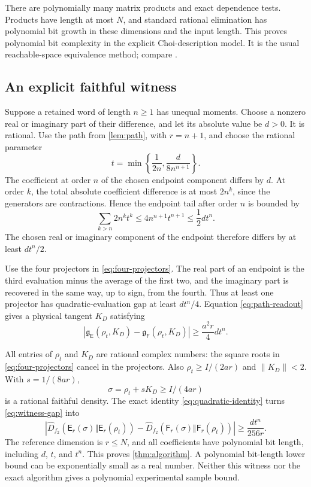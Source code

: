 \documentclass[11pt,reqno]{amsart}
\theoremstyle{definition}
\theoremstyle{remark}
\numberwithin{equation}{section}
\newcommand{\E}{\mathsf E}
\newcommand{\F}{\mathsf F}
\newcommand{\norm}[1]{\left\lVert#1\right\rVert}
\newcommand{\abs}[1]{\left\lvert#1\right\rvert}
\newcommand{\rld}{\mathfrak g}
\newcommand{\maxdiv}{\widehat D}
\begin{document}
There are polynomially many matrix products and exact dependence tests. Products have length at most $N$, and standard rational elimination has polynomial bit growth in these dimensions and the input length. This proves polynomial bit complexity in the explicit Choi-description model. It is the usual reachable-space equivalence method; compare \cite[Theorem~2]{LiQiu}.

\subsection{An explicit faithful witness}

Suppose a retained word of length $n\ge1$ has unequal moments. Choose a nonzero real or imaginary part of their difference, and let its absolute value be $d>0$. It is rational. Use the path from \cref{lem:path}, with $r=n+1$, and choose the rational parameter
\begin{equation}\label{eq:witness-t}
 t=\min\left\{\frac1{2n},\frac{d}{8n^{n+1}}\right\}.
\end{equation}
The coefficient at order $n$ of the chosen endpoint component differs by $d$. At order $k$, the total absolute coefficient difference is at most $2n^k$, since the generators are contractions. Hence the endpoint tail after order $n$ is bounded by
\[
 \sum_{k>n}2n^kt^k\le4n^{n+1}t^{n+1}\le\frac12dt^n.
\]
The chosen real or imaginary component of the endpoint therefore differs by at least $dt^n/2$.

Use the four projectors in \eqref{eq:four-projectors}. The real part of an endpoint is the third evaluation minus the average of the first two, and the imaginary part is recovered in the same way, up to sign, from the fourth. Thus at least one projector has quadratic-evaluation gap at least $dt^n/4$. Equation \eqref{eq:path-readout} gives a physical tangent $K_D$ satisfying
\begin{equation}\label{eq:witness-gap}
 \abs{\rld_\E(\rho_t,K_D)-\rld_\F(\rho_t,K_D)}
 \ge\frac{a^2r}{4}dt^n.
\end{equation}

All entries of $\rho_t$ and $K_D$ are rational complex numbers: the square roots in \eqref{eq:four-projectors} cancel in the projectors. Also $\rho_t\ge I/(2ar)$ and $\norm{K_D}<2$. With $s=1/(8ar)$,
\[
 \sigma=\rho_t+sK_D\ge I/(4ar)
\]
is a rational faithful density. The exact identity \eqref{eq:quadratic-identity} turns \eqref{eq:witness-gap} into
\[
 \abs{\maxdiv_{f_2}(\E_r(\sigma)\Vert\E_r(\rho_t))
       -\maxdiv_{f_2}(\F_r(\sigma)\Vert\F_r(\rho_t))}
 \ge\frac{dt^n}{256r}.
\]
The reference dimension is $r\le N$, and all coefficients have polynomial bit length, including $d$, $t$, and $t^n$. This proves \cref{thm:algorithm}. A polynomial bit-length lower bound can be exponentially small as a real number. Neither this witness nor the exact algorithm gives a polynomial experimental sample bound.
\end{document}
